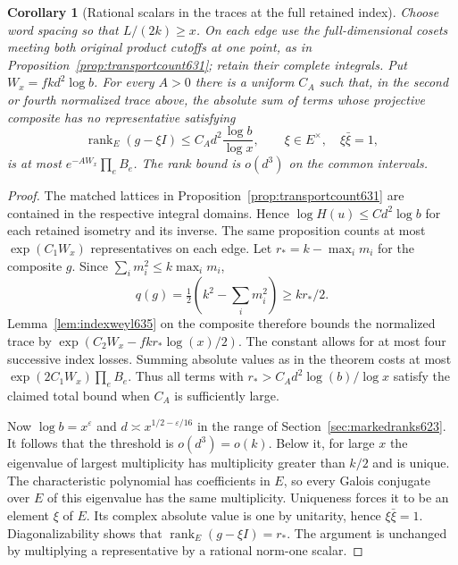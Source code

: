 \documentclass[a4paper,11pt]{article}
\newtheorem{corollary}[proposition]{Corollary}
\theoremstyle{definition}
\theoremstyle{remark}
\numberwithin{equation}{section}
\begin{document}
\begin{corollary}[Rational scalars in the traces at the full retained index]
\leavevmode\label{cor:retainedtraces635}
Choose word spacing so that \(L/(2k)\ge x\). On each edge use
the full-dimensional cosets meeting both original product cutoffs
at one point, as in Proposition~\ref{prop:transportcount631};
retain their complete integrals. Put \(W_x=fk d^2\log b\).
For every \(A>0\) there is a uniform \(C_A\) such that, in the
second or fourth normalized trace above, the absolute sum of terms
whose projective composite has no representative satisfying
\[
            \operatorname{rank}_{E}(g-\xi I)
                 \le C_A d^2\frac{\log b}{\log x},
            \qquad \xi\in E^\times,\quad \xi\bar\xi=1 ,
\]
is at most \(e^{-A W_x}\prod_e B_e\).
The rank bound is \(o(d^3)\) on the common intervals.
\end{corollary}
\begin{proof}
The matched lattices in Proposition~\ref{prop:transportcount631}
are contained in the respective integral domains. Hence
\(\log H(u)\le C d^2\log b\) for each retained isometry and its
inverse. The same proposition counts at most \(\exp(C_1W_x)\)
representatives on each edge. Let
\(r_*=k-\max_i m_i\) for the composite \(g\). Since
\(\sum_i m_i^2\le k\max_i m_i\),
\[
             q(g)=\tfrac12(k^2-\textstyle\sum_i m_i^2)
                         \ge kr_*/2 .
\]
Lemma~\ref{lem:indexweyl635} on the composite therefore bounds the
normalized trace by \(\exp(C_2W_x-fkr_*\log(x)/2)\). The constant
allows for at most four successive index losses. Summing absolute
values as in the theorem costs at most
\(\exp(2C_1W_x)\prod_e B_e\). Thus all terms with
\(r_*>C_A d^2\log(b)/\log x\) satisfy the claimed total bound
when \(C_A\) is sufficiently large.

Now \(\log b=x^\varepsilon\) and
\(d\asymp x^{1/2-\varepsilon/16}\) in the range of
Section~\ref{sec:markedranks623}. It follows that the threshold
is \(o(d^3)=o(k)\). Below it, for large \(x\) the eigenvalue of
largest multiplicity has multiplicity greater than \(k/2\) and is
unique. The characteristic polynomial has coefficients in \(E\),
so every Galois conjugate over \(E\) of this eigenvalue has the
same multiplicity. Uniqueness forces it to be an element \(\xi\)
of \(E\). Its complex absolute value is one by unitarity, hence
\(\xi\bar\xi=1\). Diagonalizability shows that
\(\operatorname{rank}_E(g-\xi I)=r_*\). The argument is unchanged
by multiplying a representative by a rational norm-one scalar.
\end{proof}
\end{document}
